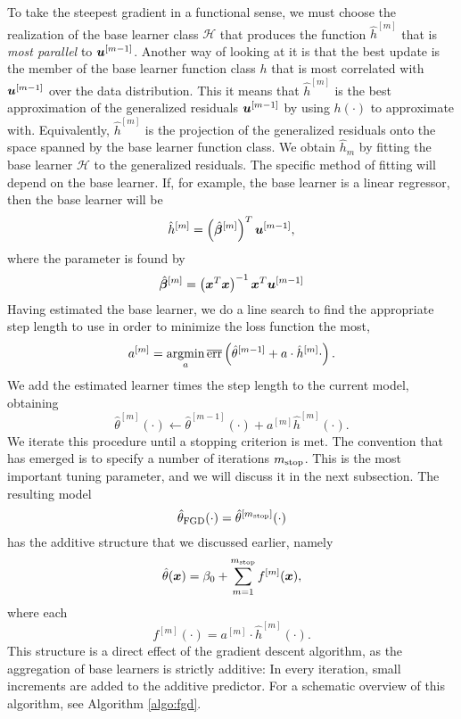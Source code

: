 To take the steepest gradient in a functional sense, we must choose the realization of the base learner class $\mathcal{H}$ that produces the function $\hat{h}^{[m]}$ that is \textit{most parallel} to $\bm{u}^{[m-1]}$.
Another way of looking at it is that the best update is the member of the base learner function class $h$ that is most correlated with $\bm{u}^{[m-1]}$ over the data distribution.
This it means that $\hat{h}^{[m]}$ is the best approximation of the generalized residuals $\bm{u}^{[m-1]}$ by using $h(\cdot)$ to approximate with.
Equivalently, $\hat{h}^{[m]}$ is the projection of the generalized residuals onto the space spanned by the base learner function class.
We obtain $\hat{h}_m$ by fitting the base learner $\mathcal{H}$ to the generalized residuals.
The specific method of fitting will depend on the base learner.
If, for example, the base learner is a linear regressor, then the base learner will be
\begin{equation*}
    \hat{h}^{[m]}=\left(\hat{\boldsymbol{\beta}}^{[m]}\right)^T\bm{u}^{[m-1]},
\end{equation*}
where the parameter is found by
\begin{equation*}
    \hat{\boldsymbol{\beta}}^{[m]}=\left(\bm{x} ^T \bm{x} \right)^{-1}\bm{x} ^T \bm{u}^{[m-1]}
\end{equation*}
Having estimated the base learner, we do a line search to find the appropriate step length to use in order to minimize the loss function the most,
\begin{equation*}
    a^{[m]}=\operatorname*{argmin}_{a}\overline{\text{err}}\left(\hat{\theta}^{[m-1]}+a\cdot\hat{h}^{[m]}{\cdot}\right).
\end{equation*}
We add the estimated learner times the step length to the current model, obtaining
\begin{equation*}
    \hat{\theta}^{[m]}(\cdot)\gets \hat{\theta}^{[m-1]}(\cdot)+a^{[m]}\hat{h}^{[m]}(\cdot).
\end{equation*}
We iterate this procedure until a stopping criterion is met.
The convention that has emerged is to specify a number of iterations $m_{\text{stop}}$.
This is the most important tuning parameter, and we will discuss it in the next subsection.
The resulting model
\begin{equation*}
    \hat{\theta}_{\text{FGD}}(\cdot)=\hat{\theta}^{[m_{\text{stop}}]}(\cdot)
\end{equation*}
has the additive structure that we discussed earlier, namely
\begin{equation*}
    \hat{\theta}(\bm{x})=\beta_0+\sum_{m=1}^{m_{\text{stop}}}f^{[m]}(\bm{x}),
\end{equation*}
where each
\begin{equation*}
    f^{[m]}(\cdot)=a^{[m]}\cdot \hat{h}^{[m]}(\cdot).
\end{equation*}
This structure is a direct effect of the gradient descent algorithm, as the aggregation of base learners is strictly additive:
In every iteration, small increments are added to the additive predictor.
For a schematic overview of this algorithm, see Algorithm \ref{algo:fgd}.

